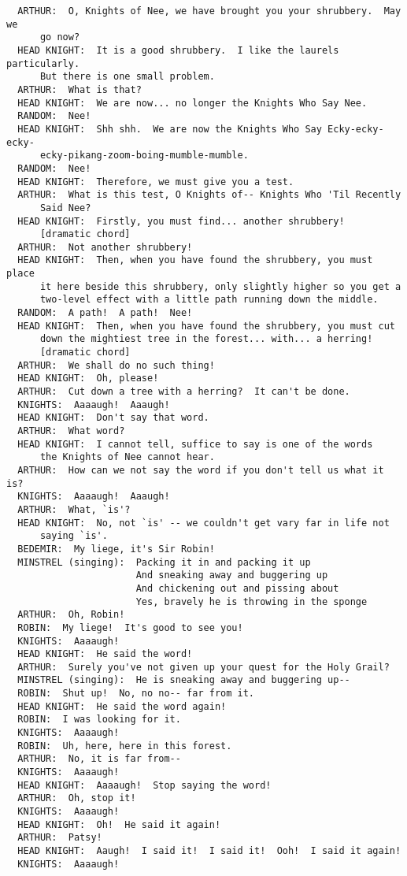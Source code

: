 \documentclass{article}
\begin{document}
\begin{verbatim}
  ARTHUR:  O, Knights of Nee, we have brought you your shrubbery.  May we
      go now?
  HEAD KNIGHT:  It is a good shrubbery.  I like the laurels particularly.
      But there is one small problem.
  ARTHUR:  What is that?
  HEAD KNIGHT:  We are now... no longer the Knights Who Say Nee.
  RANDOM:  Nee!
  HEAD KNIGHT:  Shh shh.  We are now the Knights Who Say Ecky-ecky-ecky-
      ecky-pikang-zoom-boing-mumble-mumble.
  RANDOM:  Nee!
  HEAD KNIGHT:  Therefore, we must give you a test.
  ARTHUR:  What is this test, O Knights of-- Knights Who 'Til Recently
      Said Nee?
  HEAD KNIGHT:  Firstly, you must find... another shrubbery!
      [dramatic chord]
  ARTHUR:  Not another shrubbery!
  HEAD KNIGHT:  Then, when you have found the shrubbery, you must place
      it here beside this shrubbery, only slightly higher so you get a
      two-level effect with a little path running down the middle.
  RANDOM:  A path!  A path!  Nee!
  HEAD KNIGHT:  Then, when you have found the shrubbery, you must cut
      down the mightiest tree in the forest... with... a herring!
      [dramatic chord]
  ARTHUR:  We shall do no such thing!
  HEAD KNIGHT:  Oh, please!
  ARTHUR:  Cut down a tree with a herring?  It can't be done.
  KNIGHTS:  Aaaaugh!  Aaaugh!
  HEAD KNIGHT:  Don't say that word.
  ARTHUR:  What word?
  HEAD KNIGHT:  I cannot tell, suffice to say is one of the words
      the Knights of Nee cannot hear.
  ARTHUR:  How can we not say the word if you don't tell us what it is?
  KNIGHTS:  Aaaaugh!  Aaaugh!
  ARTHUR:  What, `is'?
  HEAD KNIGHT:  No, not `is' -- we couldn't get vary far in life not
      saying `is'.
  BEDEMIR:  My liege, it's Sir Robin!
  MINSTREL (singing):  Packing it in and packing it up
                       And sneaking away and buggering up
                       And chickening out and pissing about
                       Yes, bravely he is throwing in the sponge
  ARTHUR:  Oh, Robin!
  ROBIN:  My liege!  It's good to see you!
  KNIGHTS:  Aaaaugh!
  HEAD KNIGHT:  He said the word!
  ARTHUR:  Surely you've not given up your quest for the Holy Grail?
  MINSTREL (singing):  He is sneaking away and buggering up--
  ROBIN:  Shut up!  No, no no-- far from it.
  HEAD KNIGHT:  He said the word again!
  ROBIN:  I was looking for it.
  KNIGHTS:  Aaaaugh!
  ROBIN:  Uh, here, here in this forest.
  ARTHUR:  No, it is far from--
  KNIGHTS:  Aaaaugh!
  HEAD KNIGHT:  Aaaaugh!  Stop saying the word!
  ARTHUR:  Oh, stop it!
  KNIGHTS:  Aaaaugh!
  HEAD KNIGHT:  Oh!  He said it again!
  ARTHUR:  Patsy!
  HEAD KNIGHT:  Aaugh!  I said it!  I said it!  Ooh!  I said it again!
  KNIGHTS:  Aaaaugh!


\end{verbatim}
\end{document}
